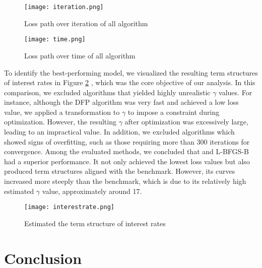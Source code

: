 \documentclass[12pt]{article}
\begin{document}
\begin{figure}[ht]
  \centering
  \begin{minipage}[t]{0.48\linewidth}
    \centering
    \texttt{[image: iteration.png]}
    \caption{Loss path over iteration of all algorithm}
    \label{fig:iterationpath}
\end{minipage}
  \hspace{0.02\linewidth}
  \begin{minipage}[t]{0.48\linewidth}
    \centering

    \texttt{[image: time.png]}
    \caption{Loss path over time of all algorithm}
    \label{fig:timepath}
  \end{minipage}
\end{figure}
To identify the best-performing model, we visualized the resulting term structures of interest rates in Figure \ref{fig:interest rate} , which was the core objective of our analysis. In this comparison, we excluded algorithms that yielded highly unrealistic $\gamma$ values. For instance, although the DFP algorithm was very fast and achieved a low loss value, we applied a transformation to $\gamma$ to impose a constraint during optimization. However, the resulting $\gamma$ after optimization was excessively large, leading to an impractical value. In addition, we excluded algorithms which showed signs of overfitting, such as those requiring more than 300 iterations for convergence.
Among the evaluated methods, we concluded that and L-BFGS-B had a superior performance. It not only achieved the lowest loss values but also produced term structures aligned with the benchmark. However, its curves increased more steeply than the benchmark, which is due to its relatively high estimated $\gamma$ value, approximately around 17.
\begin{figure}[H]
    \centering
    \texttt{[image: interestrate.png]}
    \caption{Estimated the term structure of interest rates}
    \label{fig:interest rate}
\end{figure}

\section{Conclusion}
\end{document}
